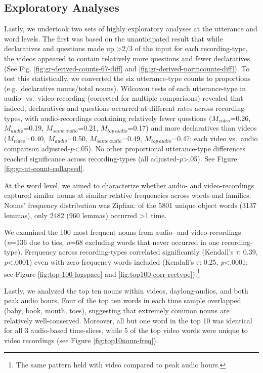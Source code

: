 \documentclass[man]{apa6}
\theoremstyle{definition}
\theoremstyle{definition}
\theoremstyle{definition}
\theoremstyle{remark}
\begin{document}
\subsection{Exploratory Analyses}\label{exploratory-analyses}

Lastly, we undertook two sets of highly exploratory analyses at the
utterance and word levels. The first was based on the unanticipated
result that while declaratives and questions made up \textgreater{}2/3
of the input for each recording-type, the videos appeared to contain
relatively more questions and fewer declaratives (See Fig.
\ref{fig:gr-derived-counts-67-diff} and
\ref{fig:gr-derived-normcounts-diff}). To test this statistically, we
converted the six utterance-type counts to proportions (e.g.~declarative
nouns/total nouns). Wilcoxon tests of each utterance-type in audio-
vs.~video-recording (corrected for multiple comparisons) revealed that
indeed, declaratives and questions occurred at different rates across
recording-types, with audio-recordings containing relatively fewer
questions (\(M_{video}\)=0.26, \(M_{audio}\)=0.19,
\(M_{same\  audio}\)=0.21, \(M_{top\  audio}\)=0.17) and more
declaratives than videos (\(M_{video}\)=0.40, \(M_{audio}\)=0.50,
\(M_{same\  audio}\)=0.49, \(M_{top\ audio}\)=0.47; each video vs.~audio
comparison adjusted-\emph{p}\textless{}.05). No other proportional
utterance-type differences reached significance across recording-types
(all adjusted-\emph{p}\textgreater{}.05). See Figure
\ref{fig:gr-ut-count-collapsed}.

At the word level, we aimed to characterize whether audio- and
video-recordings captured similar nouns at similar relative frequencies
across words and families. Nouns' frequency distribution was Zipfian: of
the 5801 unique object words (3137 lemmas), only 2482 (960 lemmas)
occurred \textgreater{}1 time.

We examined the 100 most frequent nouns from audio- and video-recordings
(\emph{n}=136 due to ties, \emph{n}=68 excluding words that never
occurred in one recording-type). Frequency across recording-types
correlated significantly (Kendall's \(\tau\): 0.39,
\emph{p}\textless{}.0001) even with zero-frequency words included
(Kendall's \(\tau\): 0.25, \emph{p}\textless{}.0001; see Figure
\ref{fig:top-100-logspace} and
\ref{fig:top100-corr-rectype}).\footnote{The same pattern held with video compared to peak audio hours.}

Lastly, we analyzed the top ten nouns within videos, daylong-audios, and
both peak audio hours. Four of the top ten words in each time sample
overlapped (baby, book, mouth, toes), suggesting that extremely common
nouns are relatively well-conserved. Moreover, all but one word in the
top 10 was identical for all 3 audio-based time-slices, while 5 of the
top video words were unique to video recordings (see Figure
\ref{fig:top10noun-freq}).
\end{document}
